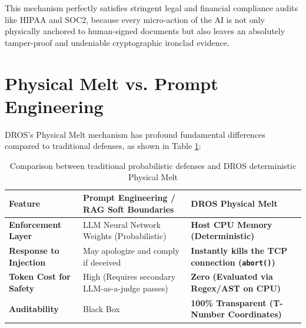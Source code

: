 \documentclass[conference]{IEEEtran}
\begin{document}
This mechanism perfectly satisfies stringent legal and financial compliance audits like HIPAA and SOC2, because every micro-action of the AI is not only physically anchored to human-signed documents but also leaves an absolutely tamper-proof and undeniable cryptographic ironclad evidence.

\section{Physical Melt vs. Prompt Engineering}
DROS's Physical Melt mechanism has profound fundamental differences compared to traditional defenses, as shown in Table \ref{tab1}:

\begin{table}[htbp]
\caption{Comparison between traditional probabilistic defenses and DROS deterministic Physical Melt}
\begin{center}
\begin{tabular}{|p{2.5cm}|p{2.5cm}|p{2.5cm}|}
\hline
\textbf{Feature} & \textbf{Prompt Engineering / RAG Soft Boundaries} & \textbf{DROS Physical Melt} \\
\hline
\textbf{Enforcement Layer} & LLM Neural Network Weights (Probabilistic) & \textbf{Host CPU Memory (Deterministic)} \\
\hline
\textbf{Response to Injection} & May apologize and comply if deceived & \textbf{Instantly kills the TCP connection (\texttt{abort()})} \\
\hline
\textbf{Token Cost for Safety} & High (Requires secondary LLM-as-a-judge passes) & \textbf{Zero (Evaluated via Regex/AST on CPU)} \\
\hline
\textbf{Auditability} & Black Box & \textbf{100\% Transparent (T-Number Coordinates)} \\
\hline
\end{tabular}
\label{tab1}
\end{center}
\end{table}
\end{document}
